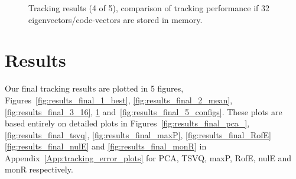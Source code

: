 								\begin{figure}[t]
								\centering
								
								\caption{Tracking results (4 of 5), comparison of tracking performance if 32 eigenvectors/code-vectors are stored in memory.}
								\label{fig:results_final_4_32}
								\end{figure}

\section{Results}
Our final tracking results are plotted in 5 figures, Figures~\ref{fig:results_final_1_best}, \ref{fig:results_final_2_mean}, \ref{fig:results_final_3_16}, \ref{fig:results_final_4_32} and~\ref{fig:results_final_5_configs}.  These plots are based entirely on detailed plots in Figures~\ref{fig:results_final_pca_}, \ref{fig:results_final_tsvq}, \ref{fig:results_final_maxP}, \ref{fig:results_final_RofE} \ref{fig:results_final_nulE} and \ref{fig:results_final_monR} in Appendix~\ref{App:tracking_error_plots} for PCA, TSVQ, maxP, RofE, nulE and monR respectively.

